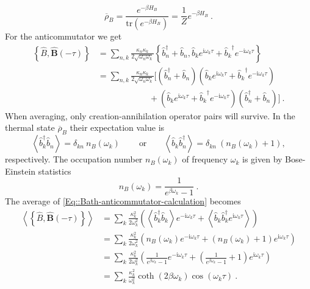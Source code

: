 	\begin{equation}
		\overline{\rho}_B =	\frac{e^{-\beta H_B}}{\text{tr}\left(e^{-\beta H_B}\right)}=\frac{1}{Z} e^{-\beta H_B}~.
	\end{equation}
	For the anticommutator we get
	\begin{equation}
		\begin{split} \label{Eq::Bath-anticommutator-calculation}
			\left\{\hat{B}, \boldsymbol{\hat{B}}(-\tau) \right\} &=	\sum_{n,k}^{} \frac{\kappa_n \kappa_k}{2 \sqrt{\omega_n \omega_k}} \left\{\hat{b}_n^\dagger + \hat{b}_n , {\hat{b}_k}e^{\mathrm{i} \omega_k \tau} + {\hat{b}_k}^\dagger e^{-\mathrm{i} \omega_k \tau} \right\} \\
			&= \sum_{n,k}^{} \frac{\kappa_n \kappa_k}{2 \sqrt{\omega_n \omega_k}} \bigg[ \left(\hat{b}_n^\dagger + \hat{b}_n \right) \left( {\hat{b}_k}e^{\mathrm{i} \omega_k \tau} + {\hat{b}_k}^\dagger e^{-\mathrm{i} \omega_k \tau} \right) \\
			& \qquad \qquad \qquad +   \left( {\hat{b}_k}e^{\mathrm{i} \omega_k \tau} + {\hat{b}_k}^\dagger e^{-\mathrm{i} \omega_k \tau} \right) \left(\hat{b}_n^\dagger + \hat{b}_n \right) \bigg]~.
		\end{split}
	\end{equation}
	When averaging, only creation-annihilation operator pairs will survive. In the thermal state $\overline{\rho}_B$ their expectation value is 
	\begin{equation}
		\left \langle \hat{b}^\dagger_k  \hat{b}_n \right \rangle =	\delta_{kn}~n_B (\omega_k)~ \qquad \text{or} \qquad \left \langle \hat{b}_k  \hat{b}_n^\dagger \right \rangle =	\delta_{kn}~(n_B (\omega_k) + 1),
	\end{equation}
	respectively. The occupation number $n_B(\omega_k)$ of frequency $\omega_k$ is given by Bose-Einstein statistics
	\begin{equation}
		n_B(\omega_k) =	\frac{1}{e^{\beta \omega_k} - 1}~.
	\end{equation}
	  The average of \eqref{Eq::Bath-anticommutator-calculation} becomes
	\begin{equation}
		\begin{split}
			\left \langle \left\{\hat{B}, \boldsymbol{\hat{B}}(-\tau) \right\} \right \rangle &=	 \sum_{k}^{} \frac{\kappa_k^2 }{2 {\omega_k^2}} \left(\left\langle \hat{b}_k^\dagger \hat{b}_k \right\rangle e^{-\mathrm{i} \omega_k \tau}   + \left\langle \hat{b}_k\hat{b}_k^\dagger  e^{\mathrm{i} \omega_k \tau} \right\rangle \right)   \\
			&=	 \sum_{k}^{} \frac{\kappa_k^2 }{2 {\omega_k^2}} \left( n_B(\omega_k) e^{-\mathrm{i} \omega_k \tau}   + (n_B(\omega_k) + 1) e^{\mathrm{i} \omega_k \tau} \right)  \\
			&=	 \sum_{k}^{} \frac{\kappa_k^2 }{2 {\omega_k^2}} \left( \frac{1}{e^{\beta \omega_k} - 1} e^{-\mathrm{i} \omega_k \tau}   + \left(\frac{1}{e^{\beta \omega_k} - 1} + 1\right) e^{\mathrm{i} \omega_k \tau} \right) \\ 
			&=	 \sum_{k}^{} \frac{\kappa_k^2 }{ {\omega_k^2}} \coth(2 \beta \omega_k) \cos(\omega_k \tau)~.
		\end{split}
	\end{equation}
